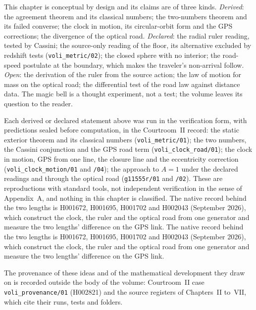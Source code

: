 This chapter is conceptual by design and its claims are of three kinds. \emph{Derived}: the agreement theorem and its classical numbers; the two-numbers theorem and its failed converse; the clock in motion, its circular-orbit form and the GPS corrections; the divergence of the optical road. \emph{Declared}: the radial ruler reading, tested by Cassini; the source-only reading of the floor, its alternative excluded by redshift tests (\texttt{voli\_metric/02}); the closed sphere with no interior; the road-speed postulate at the boundary, which makes the traveler's non-arrival follow. \emph{Open}: the derivation of the ruler from the source action; the law of motion for mass on the optical road; the differential test of the road law against distance data. The magic bell is a thought experiment, not a test; the volume leaves its question to the reader.

Each derived or declared statement above was run in the verification form, with predictions sealed before computation, in the Courtroom~II record: the static exterior theorem and its classical numbers (\texttt{voli\_metric/01}); the two numbers, the Cassini conjunction and the GPS road term (\texttt{voli\_clock\_road/01}); the clock in motion, GPS from one line, the closure line and the eccentricity correction (\texttt{voli\_clock\_motion/01} and \texttt{/04}); the approach to $A=1$ under the declared readings and through the optical road (\texttt{g11555r/01} and \texttt{/02}). These are reproductions with standard tools, not independent verification in the sense of Appendix~A, and nothing in this chapter is classified. The native record behind the two lengths is H001672, H001695, H001702 and H002043 (September 2026), which construct the clock, the ruler and the optical road from one generator and measure the two lengths' difference on the GPS link. The native record behind the two lengths is H001672, H001695, H001702 and H002043 (September 2026), which construct the clock, the ruler and the optical road from one generator and measure the two lengths' difference on the GPS link.

The provenance of these ideas and of the mathematical development they draw on is recorded outside the body of the volume: Courtroom~II case \texttt{voli\_provenance/01} (H002821) and the source registers of Chapters~II to~VII, which cite their runs, tests and folders.
